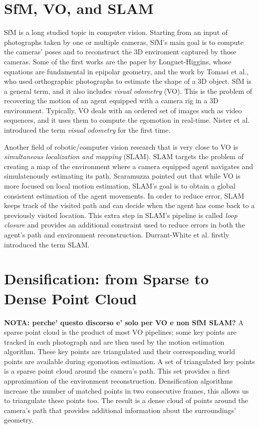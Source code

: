 \section{SfM, VO, and SLAM}
SfM is a long studied topic in computer vision. Starting from an input of photographs taken by one or multiple cameras, SfM's main goal is to compute the cameras' poses and to reconstruct the 3D enviroment captured by those cameras.
%
Some of the first works are the paper by Longuet-Higgins\cite{longuet1981computer}, whose equations are fundamental in epipolar geometry, and the work by Tomasi et al.\cite{tomasi1992shape}, who used orthographic photographs to estimate the shape of a 3D object.
%
SfM is a general term, and it also includes \textit{visual odometry} (VO). This is the problem of recovering the motion of an agent equipped with a camera rig in a 3D environment. Typically, VO deals with an ordered set of images such as video sequences, and it uses them to compute the egomotion in real-time. Nister et al.\cite{nister2004visual} introduced the term \textit{visual odometry} for the first time.

Another field of robotic/computer vision research that is very close to VO is \textit{simultaneous localization and mapping} (SLAM). SLAM targets the problem of creating a map of the environment where a camera equipped agent navigates and simulatenously estimating its path. Scaramuzza\cite{scaramuzzaVisualOdometryI} pointed out that while VO is more focused on local motion estimation, SLAM's goal is to obtain a global consistent estimation of the agent movements.
%
In order to reduce error, SLAM keeps track of the visited path and can decide when the agent has come back to a previously visited location. This extra step in SLAM's pipeline is called \textit{loop closure} and provides an additional constraint used to reduce errors in both the agent's path and 
environment reconstruction. Durrant-White et al.\cite{durrant1996localization} firstly introduced the term SLAM.

%
%
 
\section{Densification: from Sparse to Dense Point Cloud}
\textbf{NOTA: perche' questo discorso e' solo per VO e non SfM SLAM?}
A sparse point cloud is the product of most VO pipelines; some key points are tracked in each photograph and are then used by the motion estimation algorithm. These key points are triangulated and their corresponding world points are available during egomotion estimation.
%
A set of triangulated key points is a sparse point cloud around the camera's path. This set provides a first approximation of the environment reconstruction.
Densification algorithms increase the number of matched points in two consecutive frames, this allows us to triangulate these points too. The result is a dense cloud of points around the camera's path that provides additional information about the surroundings' geometry.

